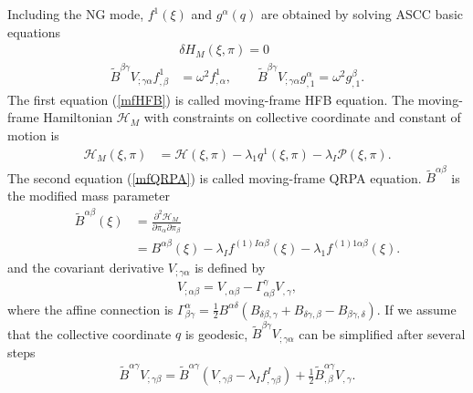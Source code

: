\documentclass[%
superscriptaddress,
showpacs,
nofootinbib,
amsmath,amssymb,
aps,
prc,
twocolumn,
floatfix ]%
{revtex4-1}
\begin{document}
Including the NG mode, $f^1(\xi)$ and $g^{\alpha}(q)$ are obtained by solving ASCC basic equations 
\begin{align}
  &\delta H_M(\xi,\pi) = 0 \label{mfHFB} \\ 
  \tilde{B}^{\beta\gamma}V_{;\gamma\alpha}f^1_{,\beta}  &= \omega^2 f^1_{,\alpha},\hspace{2em} 
  \tilde{B}^{\beta\gamma}V_{;\gamma\alpha}g^{\alpha}_{,1} = \omega^2 g^{\beta}_{,1} .
  \label{mfQRPA}
\end{align}
The first equation (\ref{mfHFB}) is called moving-frame HFB equation. The moving-frame Hamiltonian $\mathcal{H}_M$ with constraints on collective coordinate and constant of motion is
\begin{align}
  \mathcal{H}_M(\xi,\pi) &= \mathcal{H}(\xi,\pi) -\lambda_1 q^1(\xi,\pi) - \lambda_I \mathcal{P}(\xi,\pi) .
\end{align}
The second equation (\ref{mfQRPA}) is called moving-frame QRPA equation. $\tilde{B}^{\alpha\beta}$ is the modified mass parameter
\begin{align}
  \tilde{B}^{\alpha\beta}(\xi) &= \frac{\partial^2 \mathcal{H}_M}{\partial\pi_{\alpha}\partial\pi_{\beta}}  \nonumber \\
&= B^{\alpha\beta}(\xi) - \lambda_I f^{(1)I\alpha\beta}(\xi) - \lambda_1 f^{(1)1\alpha\beta}(\xi) \label{tildeB}.
\end{align} 
and the covariant derivative $V_{;\gamma\alpha}$ is defined by
\begin{align}
 V_{;\alpha\beta} = V_{,\alpha\beta} - \Gamma^{\gamma}_{\alpha\beta}V_{,\gamma} , \label{covariant}
\end{align}
where the affine connection is $\Gamma^{\alpha}_{\beta\gamma}=\frac{1}{2}B^{\alpha\delta}(B_{\delta\beta,\gamma}+B_{\delta\gamma,\beta}-B_{\beta\gamma,\delta})$. If we assume that the collective coordinate $q$ is geodesic, $\tilde{B}^{\beta\gamma}V_{;\gamma\alpha}$ can be simplified after several steps
 \begin{align}
\tilde{B}^{\alpha\gamma}V_{;\gamma\beta} = \tilde{B}^{\alpha\gamma}(V_{,\gamma\beta}-\lambda_If^I_{,\gamma\beta}) + \frac{1}{2}\tilde{B}^{\alpha\gamma}_{,\beta}V_{,\gamma} 
\label{M}.
\end{align}
\end{document}
